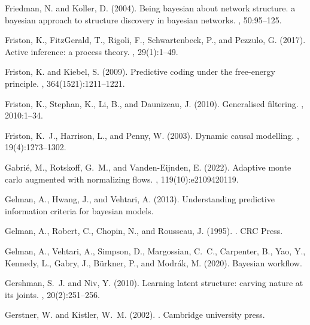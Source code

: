 \documentclass[12pt]{article}
\begin{document}
\begin{thebibliography}{}
Friedman, N. and Koller, D. (2004).
\newblock Being bayesian about network structure. a bayesian approach to
  structure discovery in bayesian networks.
, 50:95--125.

Friston, K., FitzGerald, T., Rigoli, F., Schwartenbeck, P., and Pezzulo, G.
  (2017).
\newblock Active inference: a process theory.
, 29(1):1--49.

Friston, K. and Kiebel, S. (2009).
\newblock Predictive coding under the free-energy principle.
, 364(1521):1211--1221.

Friston, K., Stephan, K., Li, B., and Daunizeau, J. (2010).
\newblock Generalised filtering.
, 2010:1--34.

Friston, K.~J., Harrison, L., and Penny, W. (2003).
\newblock Dynamic causal modelling.
, 19(4):1273--1302.

Gabri{\'e}, M., Rotskoff, G.~M., and Vanden-Eijnden, E. (2022).
\newblock Adaptive monte carlo augmented with normalizing flows.
,
  119(10):e2109420119.

Gelman, A., Hwang, J., and Vehtari, A. (2013).
\newblock Understanding predictive information criteria for bayesian models.

Gelman, A., Robert, C., Chopin, N., and Rousseau, J. (1995).
.
\newblock CRC Press.

Gelman, A., Vehtari, A., Simpson, D., Margossian, C.~C., Carpenter, B., Yao,
  Y., Kennedy, L., Gabry, J., Bürkner, P., and Modrák, M. (2020).
\newblock Bayesian workflow.

Gershman, S.~J. and Niv, Y. (2010).
\newblock Learning latent structure: carving nature at its joints.
, 20(2):251--256.

Gerstner, W. and Kistler, W.~M. (2002).
.
\newblock Cambridge university press.


\end{thebibliography}
\end{document}
